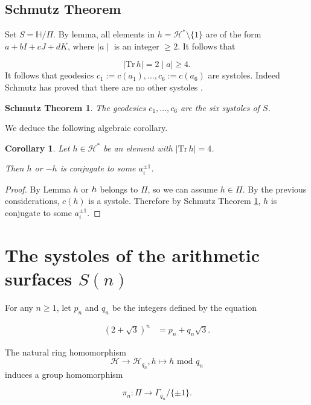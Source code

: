 \documentclass[10pt,a4paper]{amsart}
\newcommand{\HP}{\mathbb{H}}
\newcommand{\Tr}{{\mathrm {Tr}}}
\renewcommand{\mod}{\,\mathrm{mod}\,}
\newtheorem{Schmutz}[lemma]{Schmutz Theorem}
\newtheorem{cor}[lemma]{Corollary}
\newcommand{\cH}{\mathcal{H}}
\begin{document}
\subsection{Schmutz Theorem}


Set $S=\HP/\Pi$. By lemma, all elements in
$h=\cH^*\setminus\{1\}$ are of the form
$a+bI+cJ+dK$, where $\mid a\mid $ is an integer $\geq 2$.
It follows that 

$$\mid\Tr\,h\mid =2\mid a\mid \geq 4.$$
It follows that  geodesics $c_1:=c(a_1),\ldots, c_6:=c(a_6)$ are
systoles. Indeed Schmutz has proved that there are no other systoles \cite{SS}.


\begin{Schmutz} \label{schmutz} The geodesics $c_1,\ldots, c_6$ are the six systoles of $S$.
\end{Schmutz}

We deduce the following algebraic corollary.

\begin{cor}\label{corSchmutz} Let $h\in\cH^*$ be an element
with $\mid\Tr\,h\mid=4$. 

Then $h$ or $-h$ is conjugate to some 
$a_i^{\pm1}$.
\end{cor} 

\begin{proof}  By Lemma $h$ or $\-h$ belongs to $\Pi$,
so we can assume $h\in\Pi$.
By the previous considerations, $c(h)$ is
a systole. Therefore by
Schmutz Theorem \ref{schmutz},
$h$ is conjugate to some 
$a_i^{\pm1}$.
\end{proof} 










\section{The systoles of the arithmetic surfaces $S(n)$}

For any $n\geq 1$, let $p_n$ and $q_n$ 
be the integers defined by the equation

\begin{align}
(2+\sqrt{3})^n&=p_n+q_n\sqrt{3}.\label{defpq}
\end{align}

\noindent The natural
ring homomorphism 
$$\cH\to \cH_{q_n}, h\mapsto h\,\mod\,q_n$$
 induces a group homomorphism

$$\pi_n: \Pi\to \Gamma_{q_n}/\{\pm1\}.$$
\end{document}
